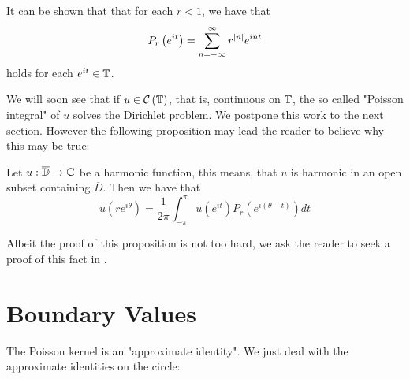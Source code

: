 It can be shown that that for each $r<1$, we have that 
\begin{equation*}
    P_{r}\left( e^{it} \right) = \sum_{n=-\infty}^{\infty} r^{\left\lvert n \right\rvert}e^{int}
\end{equation*}
holds for each $e^{it} \in \mathbb T$.

We will soon see that if $u \in {\cal C} \left( \mathbb T \right)$, that is, continuous on $\mathbb T$, the so called "Poisson integral" of $u$ solves the Dirichlet problem. We postpone this work to the next section. However the following proposition may lead the reader to believe why this may be true:
\begin{proposition}
    Let $u: \overline{\mathbb D} \to \mathbb C$ be a harmonic function, this means, that $u$ is harmonic in an open subset containing $\overline{D}$. Then we have that
    \begin{equation}
	u\left( re^{i\theta} \right) = \frac{1}{2\pi} \int_{-\pi}^{\pi} u\left( e^{it} \right) P_{r} \left( e^{i\left( \theta -t \right)} \right) dt
    \end{equation}
    \label{prop:poisson-integral-formula-for-harmonic-function}
\end{proposition}

Albeit the proof of this proposition is not too hard, we ask the reader to seek a proof of this fact in \cite{hoffman2007banach}.

\section{Boundary Values}

The Poisson kernel is an "approximate identity". We just deal with the approximate identities on the circle:

